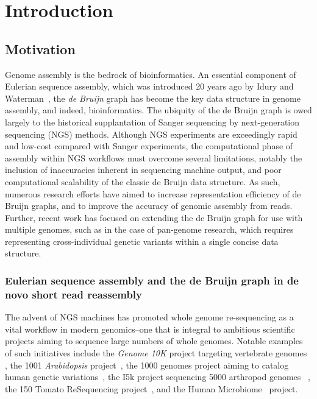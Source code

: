 \chapter{Introduction}
\label{chp:introduction}

\section{Motivation}
\label{sec:motivation}


Genome assembly is the bedrock of bioinformatics. An essential component of Eulerian sequence assembly, which was introduced 20 years ago by Idury and Waterman~\cite{IW95}, the {\em de Bruijn} graph has become the key data structure in genome assembly, and indeed, bioinformatics. The ubiquity of the de Bruijn graph is owed largely to the historical supplantation of Sanger sequencing by next-generation sequencing (NGS) methods. Although NGS experiments are exceedingly rapid and low-cost compared with Sanger experiments, the computational phase of assembly within NGS workflows must overcome several limitations, notably the inclusion of inaccuracies inherent in sequencing machine output, and poor computational scalability of the classic de Bruijn data structure. As such, numerous research efforts have aimed to increase representation efficiency of de Bruijn graphs, and to improve the accuracy of genomic assembly from reads. Further, recent work has focused on extending the de Bruijn graph for use with multiple genomes, such as in the case of pan-genome research, which requires representing cross-individual genetic variants within a single concise data structure.

\subsection{Eulerian sequence assembly and the de Bruijn graph in de novo short read reassembly}

The advent of NGS machines has promoted whole genome re-sequencing as a
vital workflow in modern genomics--one that is integral to ambitious scientific projects aiming to sequence large numbers of whole genomes. Notable examples of such initiatives include
the {\em Genome 10K} project targeting vertebrate genomes~%
\cite{Haussler:2009},
the 1001 \emph{Arabidopsis}
project~\cite{Ossowski08}, the 1000 genomes project aiming to catalog human genetic variations~\cite{Abecasis12}, the I5k project sequencing 5000 arthropod genomes~%
\cite{Robinson11},
the 150 Tomato ReSequencing project~\cite{tomato1,tomato2}, and the Human Microbiome~\cite{hmp} project.


